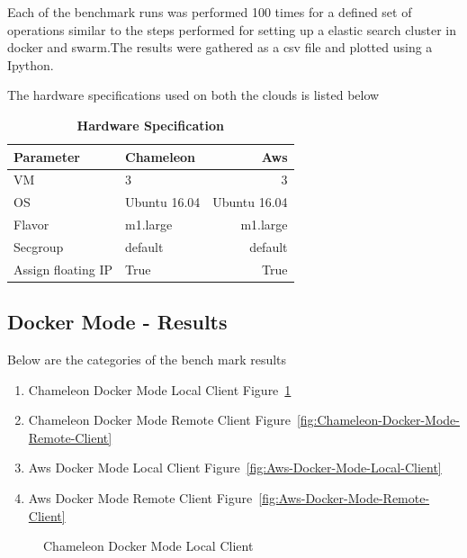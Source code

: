 \documentclass[9pt,twocolumn,twoside]{../../styles/osajnl}
\begin{document}
Each of the benchmark runs was performed 100 times for a defined set of operations similar to the steps performed for setting up a elastic search cluster in docker and swarm.The results were gathered as a csv file  and plotted using a Ipython\cite{www-ipython}.

The hardware specifications used on both the clouds is listed below
\begin{table}[htbp]
\centering
\caption{\bf Hardware Specification}
  \begin{tabular}{ l|l|r}
    \hline
    Parameter & Chameleon & Aws\\
    \hline
    VM & 3 & 3 \\
    OS & Ubuntu 16.04 & Ubuntu 16.04 \\
    Flavor & m1.large & m1.large \\
    Secgroup & default & default \\
    Assign floating IP & True & True \\
    \hline
  \end{tabular}
  \label{tab:cloudconfig}
\end{table}

\subsection{Docker Mode - Results}

Below are the categories of the bench mark results
\begin{enumerate}
\item Chameleon Docker Mode Local Client Figure~\ref{fig:Chameleon-Docker-Mode-Local-Client}
\item Chameleon Docker Mode Remote Client Figure~\ref{fig:Chameleon-Docker-Mode-Remote-Client}
\item Aws Docker Mode Local Client Figure~\ref{fig:Aws-Docker-Mode-Local-Client}
\item Aws Docker Mode Remote Client Figure~\ref{fig:Aws-Docker-Mode-Remote-Client}
\end{enumerate}


\begin{figure}[ht]
\centering
{}
\caption{Chameleon Docker Mode Local Client}
\label{fig:Chameleon-Docker-Mode-Local-Client}
\end{figure}
\end{document}

